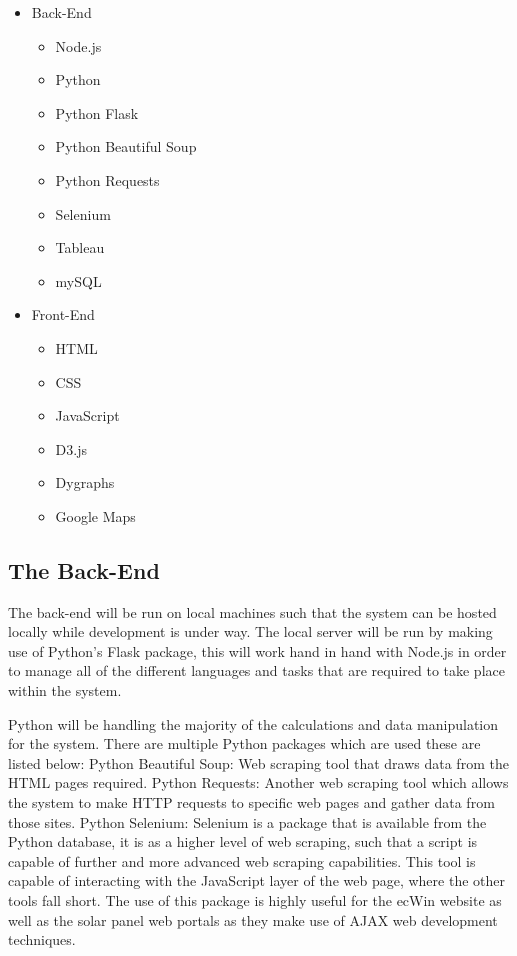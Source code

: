 \documentclass[12pt,onecolumn]{IEEEtran}
\begin{document}
\begin{itemize}
    \item Back-End
    \begin{itemize}
        \item Node.js
        \item Python
        \item Python Flask
        \item Python Beautiful Soup
        \item Python Requests
        \item Selenium
        \item Tableau
        \item mySQL
    \end{itemize}
    \item Front-End
    \begin{itemize}
        \item HTML
        \item CSS
        \item JavaScript
        \item D3.js
        \item Dygraphs
        \item Google Maps
    \end{itemize}
\end{itemize}

\subsection{The Back-End}
The back-end will be run on local machines such that the system can be hosted locally while development is under way. 
The local server will be run by making use of Python's Flask package, this will work hand in hand with Node.js in order to manage all of the different languages and tasks that are required to take place within the system. 

Python will be handling the majority of the calculations and data manipulation for the system. There are multiple Python packages which are used these are listed below:
Python Beautiful Soup: Web scraping tool that draws data from the HTML pages required.
Python Requests: Another web scraping tool which allows the system to make HTTP requests to specific web pages and gather data from those sites. 
Python Selenium: Selenium is a package that is available from the Python database, it is as a higher level of web scraping, such that a script is capable of further and more advanced web scraping capabilities. This tool is capable of interacting with the JavaScript layer of the web page, where the other tools fall short. The use of this package is highly useful for the ecWin website as well as the solar panel web portals as they make use of AJAX web development techniques.
\end{document}
